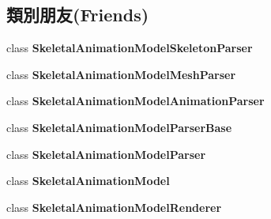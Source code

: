 \subsection*{類別朋友(Friends)}
\begin{DoxyCompactItemize}
\item 
class {\bfseries Skeletal\+Animation\+Model\+Skeleton\+Parser}\hypertarget{class_i_dream_sky_1_1_skeletal_animation_model_a14bd27cfabbcaeaa0eccce0e2968a6a1}{}\label{class_i_dream_sky_1_1_skeletal_animation_model_a14bd27cfabbcaeaa0eccce0e2968a6a1}

\item 
class {\bfseries Skeletal\+Animation\+Model\+Mesh\+Parser}\hypertarget{class_i_dream_sky_1_1_skeletal_animation_model_a85398ce1e5e5023cd13165515f7cfbfa}{}\label{class_i_dream_sky_1_1_skeletal_animation_model_a85398ce1e5e5023cd13165515f7cfbfa}

\item 
class {\bfseries Skeletal\+Animation\+Model\+Animation\+Parser}\hypertarget{class_i_dream_sky_1_1_skeletal_animation_model_ade6e25226df119aaa0de3f45d908a551}{}\label{class_i_dream_sky_1_1_skeletal_animation_model_ade6e25226df119aaa0de3f45d908a551}

\item 
class {\bfseries Skeletal\+Animation\+Model\+Parser\+Base}\hypertarget{class_i_dream_sky_1_1_skeletal_animation_model_a11930f7450c30641e8526b073100f760}{}\label{class_i_dream_sky_1_1_skeletal_animation_model_a11930f7450c30641e8526b073100f760}

\item 
class {\bfseries Skeletal\+Animation\+Model\+Parser}\hypertarget{class_i_dream_sky_1_1_skeletal_animation_model_a472cd974e223ab8bf1063fc39c8a7d43}{}\label{class_i_dream_sky_1_1_skeletal_animation_model_a472cd974e223ab8bf1063fc39c8a7d43}

\item 
class {\bfseries Skeletal\+Animation\+Model}\hypertarget{class_i_dream_sky_1_1_skeletal_animation_model_a40c4f607e5b71602c57777a29d5b4d31}{}\label{class_i_dream_sky_1_1_skeletal_animation_model_a40c4f607e5b71602c57777a29d5b4d31}

\item 
class {\bfseries Skeletal\+Animation\+Model\+Renderer}\hypertarget{class_i_dream_sky_1_1_skeletal_animation_model_a9a80d2b83f1f7bd922df78f21ee526db}{}\label{class_i_dream_sky_1_1_skeletal_animation_model_a9a80d2b83f1f7bd922df78f21ee526db}

\end{DoxyCompactItemize}


